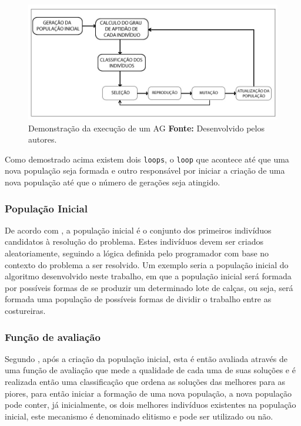 \begin{figure}[h!]
	\centerline{\includegraphics[scale=0.6]{./imagens/algoritimos_geneticos.jpg}}
	\caption[Demonstração da execução de um AG]
	{Demonstração da execução de um AG \textbf{Fonte:} Desenvolvido pelos autores.}
	\label{fig:exemplo1}
\end{figure}

\par Como demostrado acima existem dois \texttt{loops}, o
\texttt{loop} que acontece até que uma nova população seja formada e outro
responsável por  iniciar a criação de uma nova população até que o
número de gerações seja atingido.

\subsubsection{População Inicial}

\par De acordo com , a população inicial 
é o conjunto dos primeiros indivíduos candidatos à resolução do problema. Estes
indivíduos devem ser criados aleatoriamente, seguindo a lógica definida pelo programador com base no contexto do 
problema a ser resolvido. Um exemplo seria a população inicial do algoritmo desenvolvido neste trabalho, 
em que a população inicial será formada por possíveis formas de se produzir um determinado lote de calças, 
ou seja, será formada uma população de possíveis formas de dividir o trabalho entre as costureiras.

\subsubsection{Função de avaliação}

\par Segundo , após a criação da população
inicial, esta é então avaliada através de uma função de avaliação que mede a
qualidade de cada uma de suas soluções e é realizada então uma classificação que ordena as soluções das melhores para as
piores, para então iniciar a formação de uma nova população, a nova população
pode conter, já inicialmente, os dois melhores indivíduos existentes na
população inicial, este mecanismo é denominado elitismo e pode ser utilizado ou
não.

